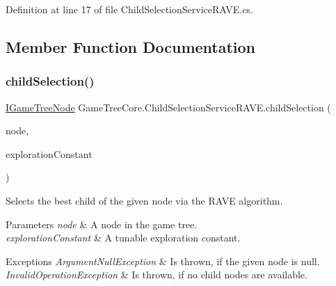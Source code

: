 Definition at line 17 of file Child\+Selection\+Service\+R\+A\+V\+E.\+cs.



\subsection{Member Function Documentation}
\mbox{\label{class_game_tree_core_1_1_child_selection_service_r_a_v_e_a5a6fe93864c94224724eee96f51fd9af}} 
\subsubsection{\texorpdfstring{child\+Selection()}{childSelection()}}
{\footnotesize\ttfamily \mbox{\hyperlink{interface_game_tree_core_1_1_i_game_tree_node}{I\+Game\+Tree\+Node}} Game\+Tree\+Core.\+Child\+Selection\+Service\+R\+A\+V\+E.\+child\+Selection (\begin{DoxyParamCaption}\item[{\mbox{\hyperlink{interface_game_tree_core_1_1_i_game_tree_node}{I\+Game\+Tree\+Node}}}]{node,  }\item[{double}]{exploration\+Constant }\end{DoxyParamCaption})}



Selects the best child of the given node via the R\+A\+VE algorithm. 


\begin{DoxyParams}{Parameters}
{\em node} & A node in the game tree.\\
\hline
{\em exploration\+Constant} & A tunable exploration constant.\\
\hline
\end{DoxyParams}

\begin{DoxyExceptions}{Exceptions}
{\em Argument\+Null\+Exception} & Is thrown, if the given node is null.\\
\hline
{\em Invalid\+Operation\+Exception} & Is thrown, if no child nodes are available.\\
\hline
\end{DoxyExceptions}


